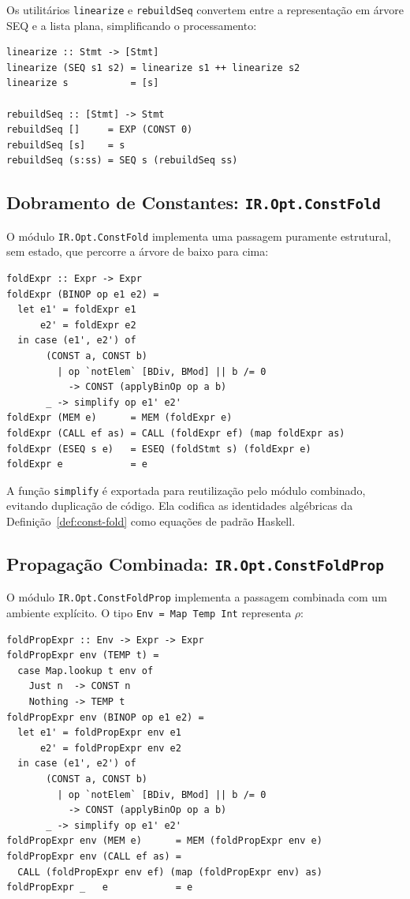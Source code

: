 Os utilitários \texttt{linearize} e \texttt{rebuildSeq} convertem entre a
representação em árvore SEQ e a lista plana, simplificando o processamento:

\begin{verbatim}
linearize :: Stmt -> [Stmt]
linearize (SEQ s1 s2) = linearize s1 ++ linearize s2
linearize s           = [s]

rebuildSeq :: [Stmt] -> Stmt
rebuildSeq []     = EXP (CONST 0)
rebuildSeq [s]    = s
rebuildSeq (s:ss) = SEQ s (rebuildSeq ss)
\end{verbatim}

\subsection{Dobramento de Constantes:
\texttt{IR.Opt.ConstFold}}\label{sec:impl-fold}

O módulo \texttt{IR.Opt.ConstFold} implementa uma passagem puramente
estrutural, sem estado, que percorre a árvore de baixo para cima:

\begin{verbatim}
foldExpr :: Expr -> Expr
foldExpr (BINOP op e1 e2) =
  let e1' = foldExpr e1
      e2' = foldExpr e2
  in case (e1', e2') of
       (CONST a, CONST b)
         | op `notElem` [BDiv, BMod] || b /= 0
           -> CONST (applyBinOp op a b)
       _ -> simplify op e1' e2'
foldExpr (MEM e)      = MEM (foldExpr e)
foldExpr (CALL ef as) = CALL (foldExpr ef) (map foldExpr as)
foldExpr (ESEQ s e)   = ESEQ (foldStmt s) (foldExpr e)
foldExpr e            = e
\end{verbatim}

A função \texttt{simplify} é exportada para reutilização pelo módulo
combinado, evitando duplicação de código.  Ela codifica as identidades
algébricas da Definição~\ref{def:const-fold} como equações de padrão Haskell.

\subsection{Propagação Combinada:
\texttt{IR.Opt.ConstFoldProp}}\label{sec:impl-foldprop}

O módulo \texttt{IR.Opt.ConstFoldProp} implementa a passagem combinada com um
ambiente explícito.  O tipo \texttt{Env = Map Temp Int} representa $\rho$:

\begin{verbatim}
foldPropExpr :: Env -> Expr -> Expr
foldPropExpr env (TEMP t) =
  case Map.lookup t env of
    Just n  -> CONST n
    Nothing -> TEMP t
foldPropExpr env (BINOP op e1 e2) =
  let e1' = foldPropExpr env e1
      e2' = foldPropExpr env e2
  in case (e1', e2') of
       (CONST a, CONST b)
         | op `notElem` [BDiv, BMod] || b /= 0
           -> CONST (applyBinOp op a b)
       _ -> simplify op e1' e2'
foldPropExpr env (MEM e)      = MEM (foldPropExpr env e)
foldPropExpr env (CALL ef as) =
  CALL (foldPropExpr env ef) (map (foldPropExpr env) as)
foldPropExpr _   e            = e
\end{verbatim}

